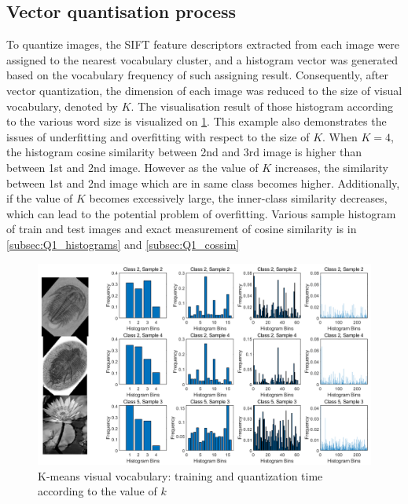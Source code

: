 \subsection{Vector quantisation process}
\label{subsec:Q1_2}
 To quantize images, the SIFT feature descriptors extracted from each image were assigned to the nearest vocabulary cluster, and a histogram vector was generated based on the vocabulary frequency of such assigning result. Consequently, after vector quantization, the dimension of each image was reduced to the size of visual vocabulary, denoted by $K$. The visualisation result of those histogram according to the various word size is visualized on \cref{fig:q1-fig2}. This example also demonstrates the issues of underfitting and overfitting with respect to the size of $K$. When $K=4$, the histogram cosine similarity between 2nd and 3rd image is higher than between 1st and 2nd image. However as the value of $K$ increases, the similarity between 1st and 2nd image which are in same class becomes higher. Additionally, if the value of $K$ becomes excessively large, the inner-class similarity decreases, which can lead to the potential problem of overfitting. Various sample histogram of train and test images and exact measurement of cosine similarity is in \cref{subsec:Q1_histograms} and \cref{subsec:Q1_cossim}
 
 \begin{figure}
 	\centering
 	\includegraphics[width=0.5\linewidth]{image/q1-fig2.png}
 	\caption{K-means visual vocabulary: training and quantization time according to the value of $k$}
 	\label{fig:q1-fig2}
 \end{figure}
 